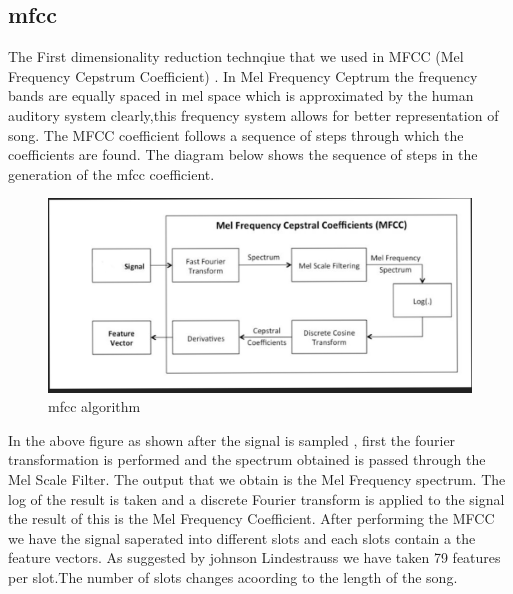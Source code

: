 \documentclass[12pt]{article}
\begin{document}
\subsection{mfcc}
The First dimensionality reduction technqiue that we used in MFCC (Mel Frequency Cepstrum Coefficient) \cite{logmfcc}. In Mel Frequency Ceptrum the frequency bands are equally spaced in mel space which is approximated by the human auditory system clearly,this frequency system allows for better representation of song.
The MFCC coefficient follows a sequence of steps through which the coefficients are found.
The diagram below shows the sequence of steps in the generation of the mfcc coefficient.
\begin{figure}[H]
\center
\includegraphics [scale=0.5]{mfcc.png}
\caption{mfcc algorithm}
\end{figure}
In the above figure as shown after the signal is sampled , first the fourier transformation is performed and the spectrum obtained is passed through the Mel Scale Filter. The output that we obtain is the Mel Frequency spectrum.
The log of the result is taken and a discrete Fourier transform is applied to the signal the result of this is the Mel Frequency Coefficient.
After performing the MFCC we have the signal saperated into different slots and each slots contain a the feature vectors. As suggested by johnson Lindestrauss we have taken 79 features per slot.The number of slots changes acoording to the length of the song.
\end{document}
